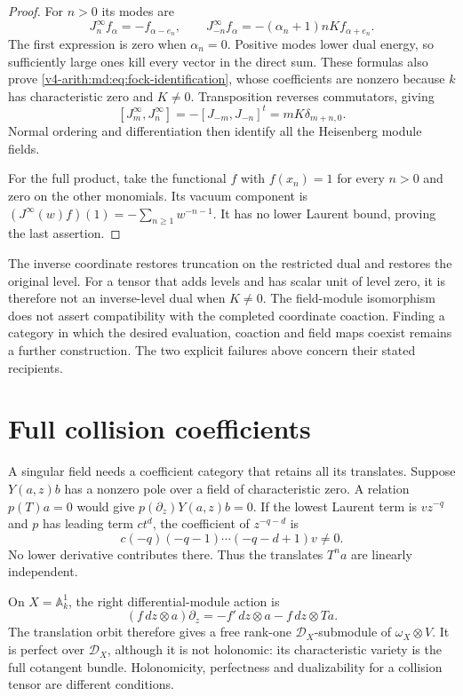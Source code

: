 \begin{proof}
For $n>0$ its modes are
\[
 J^\infty_nf_\alpha=-f_{\alpha-e_n},\qquad
 J^\infty_{-n}f_\alpha=-(\alpha_n+1)nKf_{\alpha+e_n}.
\]
The first expression is zero when $\alpha_n=0$.
Positive modes lower dual energy, so sufficiently large
ones kill every vector in the direct sum. These formulas
also prove \eqref{v4-arith:md:eq:fock-identification}, whose
coefficients are nonzero because $k$ has characteristic
zero and $K\ne0$.
Transposition reverses commutators, giving
\[
 [J^\infty_m,J^\infty_n]
 =-[J_{-m},J_{-n}]^t=mK\delta_{m+n,0}.
\]
Normal ordering and differentiation then identify all the
Heisenberg module fields.

For the full product, take the functional $f$ with
$f(x_n)=1$ for every $n>0$ and zero on the other monomials.
Its vacuum component is
$(J^\infty(w)f)(1)=-\sum_{n\geq1}w^{-n-1}$.
It has no lower Laurent bound, proving the last assertion.
\end{proof}

The inverse coordinate restores truncation on the restricted
dual and restores the original level. For a tensor that adds
levels and has scalar unit of level zero, it is therefore
not an inverse-level dual when $K\ne0$.
The field-module isomorphism does not assert compatibility
with the completed coordinate coaction. Finding a category
in which the desired evaluation, coaction and field maps
coexist remains a further construction. The two explicit
failures above concern their stated recipients.

\section{Full collision coefficients}
\label{v4-arith:md:sec:full}

A singular field needs a coefficient category that retains
all its translates. Suppose $Y(a,z)b$ has a nonzero pole
over a field of characteristic zero. A relation $p(T)a=0$
would give $p(\partial_z)Y(a,z)b=0$. If the lowest Laurent
term is $vz^{-q}$ and $p$ has leading term $ct^d$, the
coefficient of $z^{-q-d}$ is
\[
 c(-q)(-q-1)\cdots(-q-d+1)v\ne0.
\]
No lower derivative contributes there. Thus the translates
$T^na$ are linearly independent.

On $X=\mathbb A^1_k$, the right differential-module action is
\begin{equation}\label{v4-arith:md:eq:right-current}
 (f\,dz\otimes a)\partial_z
 =-f'\,dz\otimes a-f\,dz\otimes Ta.
\end{equation}
The translation orbit therefore gives a free rank-one
$\mathcal D_X$-submodule of $\omega_X\otimes V$.
It is perfect over $\mathcal D_X$, although it is not
holonomic: its characteristic variety is the full cotangent
bundle. Holonomicity, perfectness and dualizability for a
collision tensor are different conditions.

